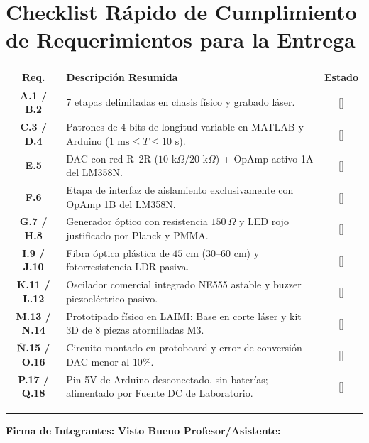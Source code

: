 \documentclass[10pt,a4paper]{article}
\begin{document}
\section{Checklist Rápido de Cumplimiento de Requerimientos para la Entrega}

\begin{table}[h!]
\centering
\footnotesize
\renewcommand{\arraystretch}{1.1}
\begin{tabular}{cp{10.5cm}c}
\toprule
\textbf{Req.} & \textbf{Descripción Resumida} & \textbf{Estado} \\
\midrule
\textbf{A.1 / B.2} & 7 etapas delimitadas en chasis físico y grabado láser. & [\quad] \\
\textbf{C.3 / D.4} & Patrones de 4 bits de longitud variable en MATLAB y Arduino ($1\text{ ms} \le T \le 10\text{ s}$). & [\quad] \\
\textbf{E.5}       & DAC con red R--2R ($10\text{ k}\Omega / 20\text{ k}\Omega$) + OpAmp activo 1A del LM358N. & [\quad] \\
\textbf{F.6}       & Etapa de interfaz de aislamiento exclusivamente con OpAmp 1B del LM358N. & [\quad] \\
\textbf{G.7 / H.8} & Generador óptico con resistencia $150\ \Omega$ y LED rojo justificado por Planck y PMMA. & [\quad] \\
\textbf{I.9 / J.10}& Fibra óptica plástica de $45\text{ cm}$ ($30\text{--}60\text{ cm}$) y fotorresistencia LDR pasiva. & [\quad] \\
\textbf{K.11 / L.12}& Oscilador comercial integrado NE555 astable y buzzer piezoeléctrico pasivo. & [\quad] \\
\textbf{M.13 / N.14}& Prototipado físico en LAIMI: Base en corte láser y kit 3D de 8 piezas atornilladas M3. & [\quad] \\
\textbf{\~N.15 / O.16}& Circuito montado en protoboard y error de conversión DAC menor al $10\%$. & [\quad] \\
\textbf{P.17 / Q.18}& Pin 5V de Arduino desconectado, sin baterías; alimentado por Fuente DC de Laboratorio. & [\quad] \\
\bottomrule
\end{tabular}
\end{table}

\vspace{0.3cm}
\noindent\rule{\textwidth}{0.4pt}
\begin{center}
\textbf{Firma de Integrantes:} \underline{\hspace{4.5cm}} \qquad \textbf{Visto Bueno Profesor/Asistente:} \underline{\hspace{4.5cm}}
\end{center}
\end{document}
